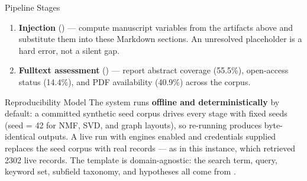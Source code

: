 \documentclass[
  ignorenonframetext,
]{beamer}
\begin{document}
\begin{frame}{Pipeline Stages}
\begin{enumerate}
  publication-ready visualizations from the analysis JSON outputs. All
  figures use a colourblind-safe palette (Wong 2011), high-contrast
  labels at \(\geq 16\)pt, and a headless matplotlib backend (Agg).
\item
  \textbf{Injection} () --- compute
  manuscript variables from the artifacts above and substitute them into
  these Markdown sections. An unresolved placeholder is a hard error,
  not a silent gap.
\item
  \textbf{Fulltext assessment} ()
  --- report abstract coverage (55.5\%), open-access status (14.4\%),
  and PDF availability (40.9\%) across the corpus.
\end{enumerate}
\end{frame}

\begin{frame}{Reproducibility Model}
\protect{}\label{reproducibility-model}
The system runs \textbf{offline and deterministically} by default: a
committed synthetic seed corpus drives every stage with fixed seeds
(seed = 42 for NMF, SVD, and graph layouts), so re-running produces
byte-identical outputs. A live run with engines enabled and credentials
supplied replaces the seed corpus with real records --- as in this
instance, which retrieved 2302 live records. The template is
domain-agnostic: the search term, query, keyword set, subfield taxonomy,
and hypotheses all come from .
\end{frame}
\end{document}
